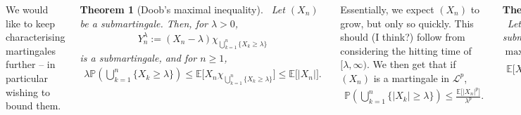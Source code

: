 \documentclass{tikzposter} %
\newcommand\rightopen[2]{\ensuremath{[#1,#2)}}
\newtheorem{theorem}{Theorem}
\begin{document}
\begin{columns}
{    We would like to keep characterising martingales further -- in particular wishing to bound them.
    \begin{theorem}[Doob's maximal inequality]
      \ Let $(X_{n})$ be a submartingale. Then, for $\lambda > 0$,
      \begin{align*}
        Y^{\lambda}_{n} := (X_{n}-\lambda)\chi_{\bigcup_{k=1}^{n} \{X_{k} \ge \lambda\}}
      \end{align*}
      is a submartingale, and for $n \ge 1$,
      \begin{align*}
        \lambda \mathbb{P}\left(\bigcup_{k=1}^{n} \{X_{k} \ge \lambda\}\right) \le \mathbb{E}\big[X_{n} \chi_{\bigcup_{k=1}^{n} \{X_{k} \ge \lambda\}}\big] \le \mathbb{E}\big[|X_{n}|\big].
      \end{align*}
    \end{theorem}

    Essentially, we expect $(X_{n})$ to grow, but only so quickly. This should (I think?) follow from considering the hitting time of $\rightopen{\lambda}{\infty}$. We then get that if $(X_{n})$ is a martingale in $\mathcal{L}^{p}$,
    \begin{align*}
      \mathbb{P}\left(\bigcup_{k = 1}^{n} \{|X_{k}| \ge \lambda \}\right) \le \frac{\mathbb{E}\big[|X_{n}|^{p}\big]}{\lambda^{p}}.
    \end{align*}
    \begin{theorem}[Doob's $\mathcal{L}^{p}$ inequality]
      \ Let $(X_{n})$ be a non-negative submartingale in $\mathcal{L}^{p}$ for $p \ge 1$. Then $\displaystyle \max_{k \le n} X_{k} \in \mathcal{L}^{p}$ and
      \begin{align*}
        \mathbb{E}\big[X^{p}_{n}\big] \le \mathbb{E}\left[\max_{k \le n} X_{k}^{p}\right] \le \left(\frac{p}{p-1}\right)^{p}\mathbb{E}\big[X^{p}_{n}\big].
      \end{align*}
    \end{theorem}
    \hphantom{}

  }
\end{columns}
\end{document}
